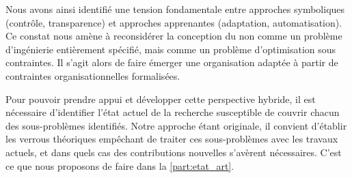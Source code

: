 Nous avons ainsi identifié une tension fondamentale entre approches symboliques (contrôle, transparence) et approches apprenantes (adaptation, automatisation). Ce constat nous amène à reconsidérer la conception du  non comme un problème d'ingénierie entièrement spécifié, mais comme un problème d'optimisation sous contraintes. Il s'agit alors de faire émerger une organisation adaptée à partir de contraintes organisationnelles formalisées.

Pour pouvoir prendre appui et développer cette perspective hybride, il est nécessaire d'identifier l'état actuel de la recherche susceptible de couvrir chacun des sous-problèmes identifiés. Notre approche étant originale, il convient d'établir les verrous théoriques empêchant de traiter ces sous-problèmes avec les travaux actuels, et dans quels cas des contributions nouvelles s'avèrent nécessaires. C'est ce que nous proposons de faire dans la \autoref{part:etat_art}.